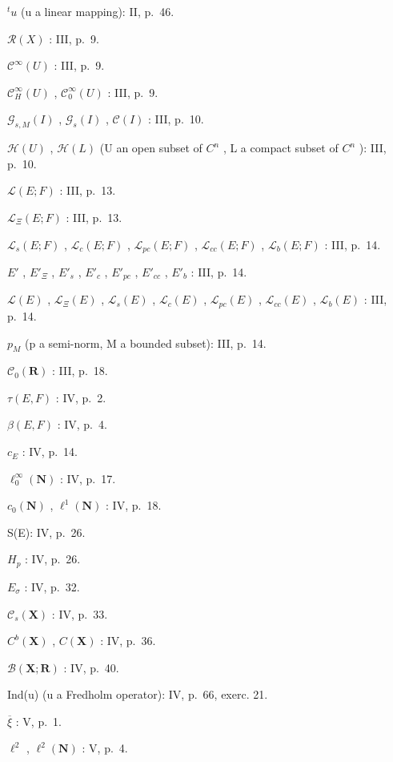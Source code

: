 \(^{t}u\) (u a linear mapping): II, p.~46.

\(\mathcal{R}(X)\) : III, p.~9.

\(\mathcal{C}^{\infty}(U)\) : III, p.~9.

\(\mathcal{C}_{H}^{\infty}(U)\) , \(\mathcal{C}_{0}^{\infty}(U)\) : III, p.~9.

\(\mathcal{G}_{s,M}(I)\) , \(\mathcal{G}_{s}(I)\) , \(\mathcal{C}(I)\) : III, p.~10.

\(\mathcal{H}(U)\) , \(\mathcal{H}(L)\) (U an open subset of \(C^{n}\) , L a compact subset of \(C^{n}\) ): III, p.~10.

\(\mathcal{L}(E; F)\) : III, p.~13.

\(\mathcal{L}_{\Xi}(E; F)\) : III, p.~13.

\(\mathcal{L}_{s}(E; F)\) , \(\mathcal{L}_{c}(E; F)\) , \(\mathcal{L}_{pc}(E; F)\) , \(\mathcal{L}_{cc}(E; F)\) , \(\mathcal{L}_{b}(E; F)\) : III, p.~14.

\(E'\) , \(E'_{\Xi}\) , \(E'_{s}\) , \(E'_{c}\) , \(E'_{pc}\) , \(E'_{cc}\) , \(E'_{b}\) : III, p.~14.

\(\mathcal{L}(E)\) , \(\mathcal{L}_{\Xi}(E)\) , \(\mathcal{L}_{s}(E)\) , \(\mathcal{L}_{c}(E)\) , \(\mathcal{L}_{pc}(E)\) , \(\mathcal{L}_{cc}(E)\) , \(\mathcal{L}_{b}(E)\) : III, p.~14.

\(p_{M}\) (p a semi-norm, M a bounded subset): III, p.~14.

\(\mathcal{C}_{0}(\mathbf{R})\) : III, p.~18.

\(\tau(E, F)\) : IV, p.~2.

\(\beta(E, F)\) : IV, p.~4.

\(c_{E}\) : IV, p.~14.

\(\ell_{0}^{\infty}(\mathbf{N})\) : IV, p.~17.

\(c_{0}(\mathbf{N})\) , \(\ell^{1}(\mathbf{N})\) : IV, p.~18.

S(E): IV, p.~26.

\(H_{p}\) : IV, p.~26.

\(E_{\sigma}\) : IV, p.~32.

\(\mathcal{C}_{s}(\mathbf{X})\) : IV, p.~33.

\(C^{b}(\mathbf{X})\) , \(C(\mathbf{X})\) : IV, p.~36.

\(\mathcal{B}(\mathbf{X};\mathbf{R})\) : IV, p.~40.

Ind(u) (u a Fredholm operator): IV, p.~66, exerc. 21.

\(\overline{\xi}\) : V, p.~1.

\(\ell^{2}\) , \(\ell^{2}(\mathbf{N})\) : V, p.~4.

